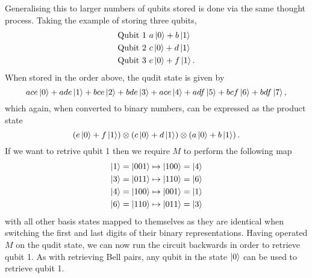 Generalising this to larger numbers of qubits stored is done via the same thought process. Taking the example of storing three qubits,
\begin{align*}
    \text{Qubit 1 } &a\ket{0} + b\ket{1}\\
    \text{Qubit 2 } &c\ket{0} + d\ket{1}\\
    \text{Qubit 3 } &e\ket{0} + f\ket{1}.
\end{align*}
When stored in the order above, the qudit state is given by
\begin{equation}
    ace\ket{0} + ade\ket{1} + bce\ket{2} + bde\ket{3} + ace\ket{4} + adf\ket{5} + bcf\ket{6} + bdf\ket{7},
\end{equation}
which again, when converted to binary numbers, can be expressed as the product state
\begin{equation}
    \left(e\ket{0} + f\ket{1}\right) \otimes \left(c\ket{0} + d\ket{1}\right) \otimes \left(a\ket{0} + b\ket{1}\right).
\end{equation}
If we want to retrive qubit 1 then we require $M$ to perform the following map
\begin{align}
    \ket{1} = \ket{001} &\mapsto \ket{100} = \ket{4}\\
    \ket{3} = \ket{011} &\mapsto \ket{110} = \ket{6}\\
    \ket{4} = \ket{100} &\mapsto \ket{001} = \ket{1}\\
    \ket{6} = \ket{110} &\mapsto \ket{011} = \ket{3}
\end{align}
with all other basis states mapped to themselves as they are identical when switching the first and last digits of their binary representations.
Having operated $M$ on the qudit state, we can now run the circuit backwards in order to retrieve qubit 1. As with retrieving Bell pairs, any qubit in the state $\ket{0}$ can be used to retrieve qubit 1.

